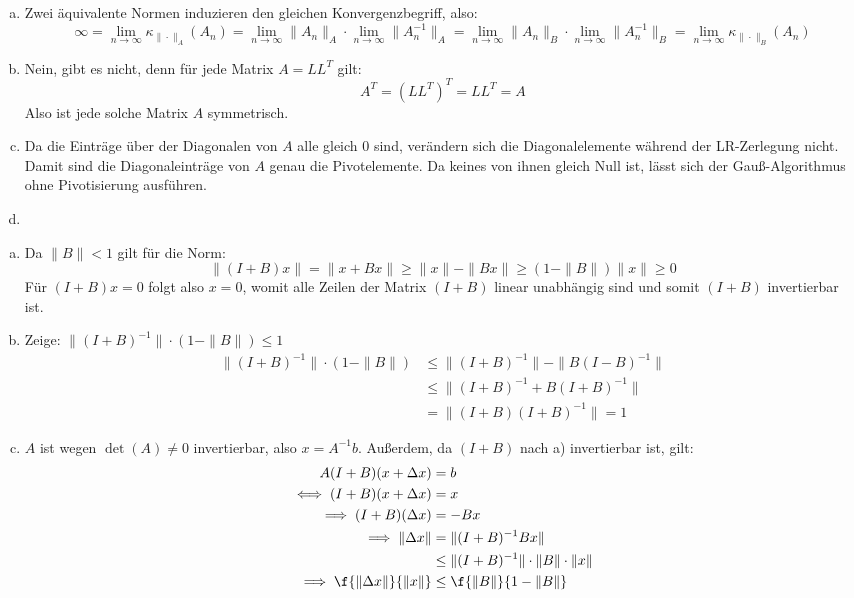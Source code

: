 \documentclass{mywork}
\begin{document}
\begin{aufgabe}
	\begin{enumerate}[a)]
		\item
			Zwei äquivalente Normen induzieren den gleichen Konvergenzbegriff, also:
			\[
				\infty = \lim_{n\to \infty}\kappa_{\|\cdot\|_A}(A_n) = \lim_{n\to\infty}\|A_n\|_A\cdot \lim_{n\to\infty}\|A_n^{-1}\|_A = \lim_{n\to\infty}\|A_n\|_B\cdot\lim_{n\to\infty}\|A_n^{-1}\|_B=\lim_{n\to \infty} \kappa_{\|\cdot\|_B}(A_n)
			\]
		\item
			Nein, gibt es nicht, denn für jede Matrix $A=LL^T$ gilt:
			\[
				A^T = (LL^T)^T = LL^T = A
			\]
			Also ist jede solche Matrix $A$ symmetrisch.
		\item
			Da die Einträge über der Diagonalen von $A$ alle gleich 0 sind, verändern sich die Diagonalelemente während der LR-Zerlegung nicht.
			Damit sind die Diagonaleinträge von $A$ genau die Pivotelemente.
			Da keines von ihnen gleich Null ist, lässt sich der Gauß-Algorithmus ohne Pivotisierung ausführen.
		\item ~
			\vspace{7em}
	\end{enumerate}
\end{aufgabe}

\setcounter{aufgabe}{1}
\begin{aufgabe}
	\begin{enumerate}[a)]
		\item
			Da $\|B\|<1$ gilt für die Norm:
			\[
				\|(I+B)x\| = \|x+Bx\| \ge \|x\| - \|Bx\| \ge (1-\|B\|)\|x\| \ge 0
			\]
			Für $(I+B)x=0$ folgt also $x=0$, womit alle Zeilen der Matrix $(I+B)$ linear unabhängig sind und somit $(I+B)$ invertierbar ist.
		\item
			Zeige: $\|(I+B)^{-1}\| \cdot (1-\|B\|) \le 1$
			\begin{align*}
				\|(I+B)^{-1}\| \cdot (1-\|B\|) &\le
				\|(I+B)^{-1}\|-\|B(I-B)^{-1}\| \\
				&\le \|(I+B)^{-1} + B(I+B)^{-1}\| \\
				&= \|(I+B)(I+B)^{-1}\| = 1
			\end{align*}
		\item
			$A$ ist wegen $\det(A)\neq 0$ invertierbar, also $x=A^{-1}b$.
			Außerdem, da $(I+B)$ nach a) invertierbar ist, gilt:
			\begin{align*}
				A(I+B)(x+\Delta x) &= b\\
			\iff (I+B)(x+\Delta x) &= x\\
			 \implies (I+B)(\Delta x) &= -Bx\\
				  \implies \|\Delta x \| & =\|(I+B)^{-1}Bx\|\\
																	   &\le \|(I+B)^{-1}\|\cdot\|B\|\cdot\|x\|\\
				\implies \f{\|\Delta x\|}{\|x\|} &\le \f{\|B\|}{1-\|B\|}
			\end{align*}
	\end{enumerate}

\end{aufgabe}
\end{document}
